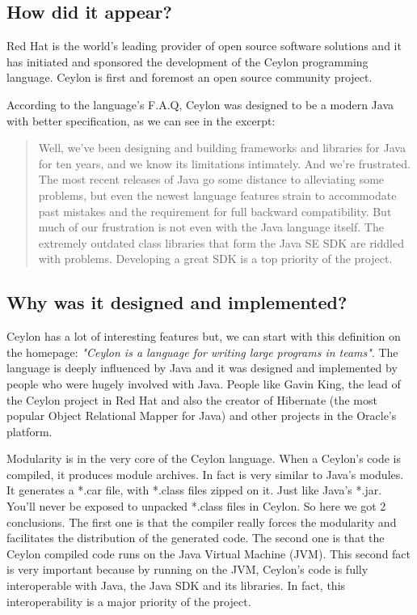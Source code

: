 
\subsection{How did it appear?}

Red Hat\cite{1_1} is the world's leading provider of open source software
solutions and it has initiated and sponsored\cite{1_2} the development
of the Ceylon programming language. Ceylon is first and foremost an open source
community project.

According to the language's F.A.Q\cite{1_3}, Ceylon was designed to be a
modern Java with better specification, as we can see in the excerpt:

\begin{quote}
Well, we've been designing and building frameworks and libraries for Java for
ten years, and we know its limitations intimately. And we're frustrated. The
most recent releases of Java go some distance to alleviating some problems,
but even the newest language features strain to accommodate past mistakes and
the requirement for full backward compatibility.
But much of our frustration is not even with the Java language itself. The
extremely outdated class libraries that form the Java SE SDK are riddled with
problems. Developing a great SDK is a top priority of the project.
\end{quote}

\subsection{Why was it designed and implemented?}

Ceylon has a lot of interesting features but, we can start with this
definition on the homepage\cite{1_4}: \textit{"Ceylon is a language for writing
large programs in teams"}. The language is deeply influenced by Java and it was
designed and implemented by people who were hugely involved with Java. People
like Gavin King, the lead of the Ceylon project in Red Hat and also the creator
of Hibernate\cite{1_5} (the most popular Object Relational Mapper for Java) and
other projects in the Oracle's platform.

Modularity is in the very core of the Ceylon language. When a Ceylon's code is
compiled, it produces module archives. In fact is very similar to Java's
modules. It generates a *.car file, with *.class files zipped on it. Just
like Java's *.jar. You'll never be exposed to unpacked *.class files in
Ceylon. So here we got 2 conclusions. The first one is that the compiler
really forces the modularity and facilitates the distribution of the generated
code. The second one is that the Ceylon compiled code runs on the Java Virtual
Machine (JVM). This second fact is very important because by running on the JVM,
Ceylon's code is fully interoperable with Java, the Java SDK and its libraries.
In fact, this interoperability is a major priority of the project.

